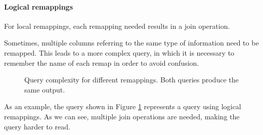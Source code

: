     \paragraph{Logical remappings}
        For local remappings, each remapping needed results in a join operation.
        
        Sometimes, multiple columns referring to the same type of information need to be remapped.
        This leads to a more complex query, in which it is necessary to remember the name of each remap in order to avoid confusion.
        
        \begin{figure}
            \centering
            \begin{subfigure}{\textwidth}
                \centering
                \label{fig:dwh:remapping:complexity:logical}
            \end{subfigure}
            
            \begin{subfigure}{\textwidth}
                \centering
                \label{fig:dwh:remapping:complexity:materialized}
            \end{subfigure}
            
            \caption{Query complexity for different remappings. Both queries produce the same output.}
            \label{fig:dwh:remapping:complexity}
        \end{figure}
        
        As an example, the query shown in Figure \ref{fig:dwh:remapping:complexity:logical} represents a query using logical remappings.
        As we can see, multiple join operations are needed, making the query harder to read.
        
